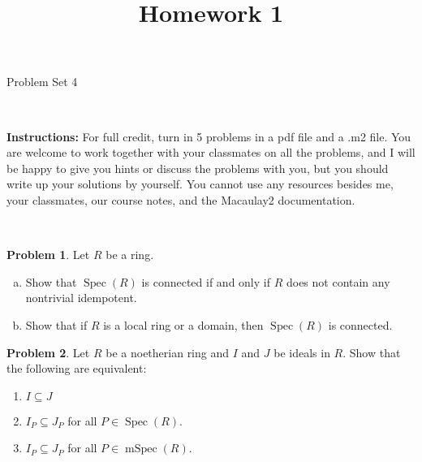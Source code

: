 \documentclass[11pt]{article}
\title{}
\date{\vspace{-0.5in}}
\title{Homework 1}
\DeclareMathOperator{\mSpec}{mSpec}
\DeclareMathOperator{\Spec}{Spec}
\theoremstyle{definition}
\newtheorem{problem}{Problem}
\begin{document}
\thispagestyle{fancy}
\pagestyle{fancy}

\vspace{3em}

\begin{center}
	{\LARGE Problem Set 4}
\end{center}

\

\noindent
{\bf Instructions:}
For full credit, turn in 5 problems in a pdf file and a .m2 file. 
You are welcome to work together with your classmates on all the problems, and I will be happy to give you hints or discuss the problems with you, but you should write up your solutions by yourself.
You cannot use any resources besides me, your classmates, our course notes, and the Macaulay2 documentation.


\vspace{2em}



\noindent
{} 

\vspace{2em}

\noindent
{}

\

\begin{problem}
Let $R$ be a ring. 
\begin{enumerate}[a)]
	\item Show that $\Spec(R)$ is connected if and only if $R$ does not contain any nontrivial idempotent.
	\item Show that if $R$ is a local ring or a domain, then $\Spec(R)$ is connected.
\end{enumerate}
\end{problem}





 
\begin{problem}
	Let $R$ be a noetherian ring and $I$ and $J$ be ideals in $R$. Show that the following are equivalent:
	\begin{enumerate}[(1)]
		\item $I \subseteq J$
		\item $I_P \subseteq J_P$ for all $P \in \Spec(R)$.
		\item $I_P \subseteq J_P$ for all $P \in \mSpec(R)$.
	\end{enumerate}
\end{problem}
\end{document}

